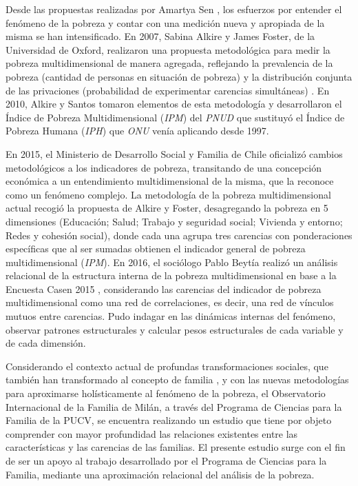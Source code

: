 \documentclass[12pt,letterpaper,spanish]{article}
\begin{document}
Desde las propuestas realizadas por Amartya Sen \cite{Sen1976Poverty:Measurement}, los esfuerzos por entender el fenómeno de la pobreza y contar con una medición nueva y apropiada de la misma se han intensificado. En 2007, Sabina Alkire y James Foster, de la Universidad de Oxford, realizaron una propuesta metodológica para medir la pobreza multidimensional de manera agregada, reflejando la prevalencia de la pobreza (cantidad de personas en situación de pobreza) y la distribución conjunta de las privaciones (probabilidad de experimentar carencias simultáneas) \cite{Alkire2007CountingMeasurement}. En 2010, Alkire y Santos tomaron elementos de esta metodología y desarrollaron el Índice de Pobreza Multidimensional (\textit{IPM}) del \textit{PNUD} \cite{Alkire2010AcuteCountries}  que sustituyó el Índice de Pobreza Humana (\textit{IPH}) que \textit{ONU} venía aplicando desde 1997. 

En 2015, el Ministerio de Desarrollo Social y Familia de Chile oficializó cambios metodológicos a los indicadores de pobreza, transitando de una concepción económica a un entendimiento multidimensional de la misma, que la reconoce como un fenómeno complejo. La metodología de la pobreza multidimensional actual recogió la propuesta de Alkire y Foster, desagregando la pobreza en 5 dimensiones (Educación; Salud; Trabajo y seguridad social; Vivienda y entorno; Redes y cohesión social), donde cada una agrupa tres carencias con ponderaciones específicas que al ser sumadas obtienen el indicador general de pobreza multidimensional (\textit{IPM}). En 2016, el sociólogo Pablo Beytía realizó un análisis relacional de la estructura interna de la pobreza multidimensional en base a la Encuesta Casen 2015 \cite{Beytia2016LaMultidimensional}, considerando las carencias del indicador de pobreza multidimensional como una red de correlaciones, es decir, una red de vínculos mutuos entre carencias. Pudo indagar en las dinámicas internas del fenómeno, observar patrones estructurales y calcular pesos estructurales de cada variable y de cada dimensión. 


Considerando el contexto actual de profundas transformaciones sociales, que también han transformado al concepto de familia \cite{OECD2011DoingChanging}, y con las nuevas metodologías para aproximarse holísticamente al fenómeno de la pobreza, el Observatorio Internacional de la Familia de Milán, a través del Programa de Ciencias para la Familia de la PUCV, se encuentra realizando un estudio que tiene por objeto comprender con mayor profundidad las relaciones existentes entre las características y las carencias de las familias. El presente estudio surge con el fin de ser un apoyo al trabajo desarrollado por el Programa de Ciencias para la Familia, mediante una aproximación relacional del análisis de la pobreza. 
\end{document}
